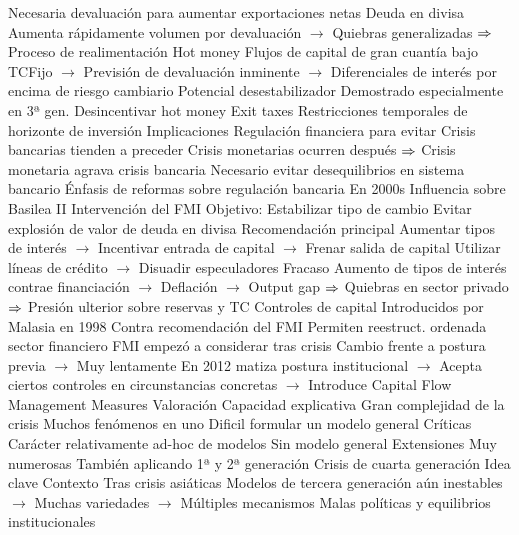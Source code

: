 \documentclass{nuevotema}
\begin{document}
\begin{esquemal}
				\4 Necesaria devaluación para aumentar exportaciones netas
				\4 Deuda en divisa
				\4[] Aumenta rápidamente volumen por devaluación
				\4[] $\to$ Quiebras generalizadas
				\4[] $\then$ Proceso de realimentación
			\3 Hot money
				\4 Flujos de capital de gran cuantía bajo TCFijo
				\4[] $\to$ Previsión de devaluación inminente
				\4[] $\to$ Diferenciales de interés por encima de riesgo cambiario
				\4 Potencial desestabilizador
				\4[] Demostrado especialmente en 3ª gen.
				\4 Desincentivar hot money
				\4[] Exit taxes
				\4[] Restricciones temporales de horizonte de inversión
		\2 Implicaciones
			\3 Regulación financiera para evitar
				\4 Crisis bancarias tienden a preceder
				\4[] Crisis monetarias ocurren después
				\4[] $\then$ Crisis monetaria agrava crisis bancaria
				\4[$\then$] Necesario evitar desequilibrios en sistema bancario
				\4 Énfasis de reformas sobre regulación bancaria
				\4[] En 2000s
				\4 Influencia sobre Basilea II
			\3 Intervención del FMI
				\4 Objetivo:
				\4[] Estabilizar tipo de cambio
				\4[] Evitar explosión de valor de deuda en divisa
				\4 Recomendación principal
				\4[] Aumentar tipos de interés
				\4[] $\to$ Incentivar entrada de capital
				\4[] $\to$ Frenar salida de capital
				\4[] Utilizar líneas de crédito
				\4[] $\to$ Disuadir especuladores
				\4 Fracaso
				\4[] Aumento de tipos de interés contrae financiación
				\4[] $\to$ Deflación
				\4[] $\to$ Output gap
				\4[] $\then$ Quiebras en sector privado
				\4[] $\then$ Presión ulterior sobre reservas y TC
			\3 Controles de capital
				\4 Introducidos por Malasia en 1998
				\4[] Contra recomendación del FMI
				\4 Permiten reestruct. ordenada sector financiero
				\4 FMI empezó a considerar tras crisis
				\4[] Cambio frente a postura previa
				\4[] $\to$ Muy lentamente
				\4[] En 2012 matiza postura institucional
				\4[] $\to$ Acepta ciertos controles en circunstancias concretas
				\4[] $\to$ Introduce Capital Flow Management Measures
		\2 Valoración
			\3 Capacidad explicativa
				\4 Gran complejidad de la crisis
				\4[] Muchos fenómenos en uno
				\4 Dificil formular un modelo general
			\3 Críticas
				\4 Carácter relativamente ad-hoc de modelos
				\4 Sin modelo general
			\3 Extensiones
				\4 Muy numerosas
				\4 También aplicando 1ª y 2ª generación
	\1 
		\2 Crisis de cuarta generación
			\3 Idea clave
				\4 Contexto
				\4[] Tras crisis asiáticas
				\4[] Modelos de tercera generación aún inestables
				\4[] $\to$ Muchas variedades
				\4[] $\to$ Múltiples mecanismos
				\4 Malas políticas y equilibrios institucionales

\end{esquemal}
\end{document}
